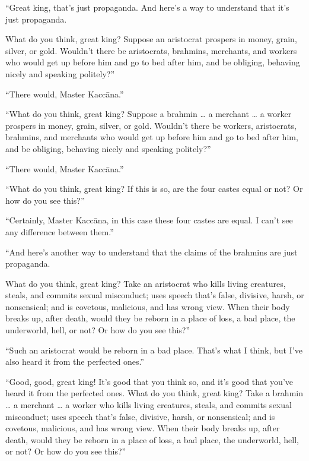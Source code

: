 \documentclass[12pt,openany]{book}%
\begin{document}
“Great king, that’s just propaganda. And here’s a way to understand that it’s just propaganda. 

What do you think, great king? Suppose an aristocrat prospers in money, grain, silver, or gold. Wouldn’t there be aristocrats, brahmins, merchants, and workers who would get up before him and go to bed after him, and be obliging, behaving nicely and speaking politely?” 

“There would, Master \textsanskrit{Kaccāna}.” 

“What do you think, great king? Suppose a brahmin … a merchant … a worker prospers in money, grain, silver, or gold. Wouldn’t there be workers, aristocrats, brahmins, and merchants who would get up before him and go to bed after him, and be obliging, behaving nicely and speaking politely?” 

“There would, Master \textsanskrit{Kaccāna}.” 

“What do you think, great king? If this is so, are the four castes equal or not? Or how do you see this?” 

“Certainly, Master \textsanskrit{Kaccāna}, in this case these four castes are equal. I can’t see any difference between them.” 

“And here’s another way to understand that the claims of the brahmins are just propaganda. 

What do you think, great king? Take an aristocrat who kills living creatures, steals, and commits sexual misconduct; uses speech that’s false, divisive, harsh, or nonsensical; and is covetous, malicious, and has wrong view. When their body breaks up, after death, would they be reborn in a place of loss, a bad place, the underworld, hell, or not? Or how do you see this?” 

“Such an aristocrat would be reborn in a bad place. That’s what I think, but I’ve also heard it from the perfected ones.” 

“Good, good, great king! It’s good that you think so, and it’s good that you’ve heard it from the perfected ones. What do you think, great king? Take a brahmin … a merchant … a worker who kills living creatures, steals, and commits sexual misconduct; uses speech that’s false, divisive, harsh, or nonsensical; and is covetous, malicious, and has wrong view. When their body breaks up, after death, would they be reborn in a place of loss, a bad place, the underworld, hell, or not? Or how do you see this?” 
\end{document}
